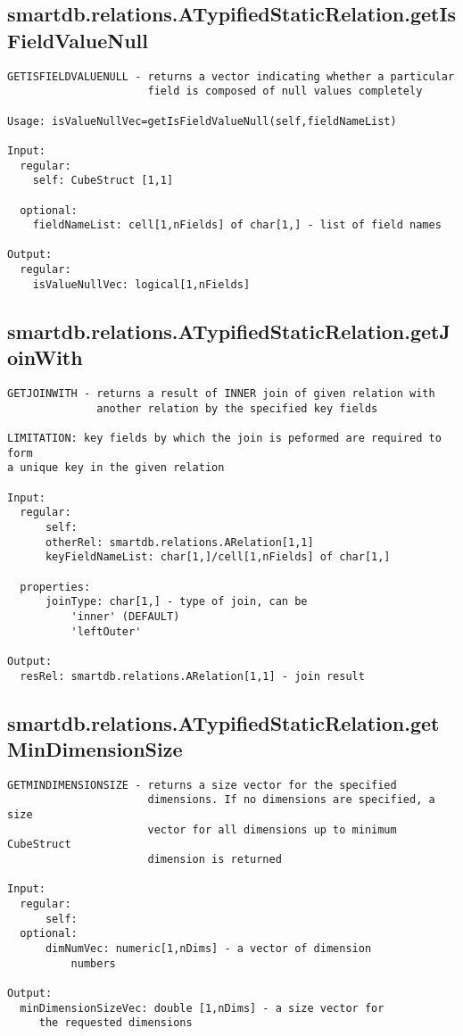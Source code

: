 \subsection{\texorpdfstring{smartdb.relations.ATypifiedStaticRelation.getIsFieldValueNull}{getIsFieldValueNull}}\label{method:smartdb.relations.ATypifiedStaticRelation.getIsFieldValueNull}
\begin{verbatim}
GETISFIELDVALUENULL - returns a vector indicating whether a particular
                      field is composed of null values completely

Usage: isValueNullVec=getIsFieldValueNull(self,fieldNameList)

Input:
  regular:
    self: CubeStruct [1,1]

  optional:
    fieldNameList: cell[1,nFields] of char[1,] - list of field names

Output:
  regular:
    isValueNullVec: logical[1,nFields]
\end{verbatim}
\subsection{\texorpdfstring{smartdb.relations.ATypifiedStaticRelation.getJoinWith}{getJoinWith}}\label{method:smartdb.relations.ATypifiedStaticRelation.getJoinWith}
\begin{verbatim}
GETJOINWITH - returns a result of INNER join of given relation with
              another relation by the specified key fields

LIMITATION: key fields by which the join is peformed are required to form
a unique key in the given relation

Input:
  regular:
      self:
      otherRel: smartdb.relations.ARelation[1,1]
      keyFieldNameList: char[1,]/cell[1,nFields] of char[1,]

  properties:
      joinType: char[1,] - type of join, can be
          'inner' (DEFAULT)
          'leftOuter'

Output:
  resRel: smartdb.relations.ARelation[1,1] - join result
\end{verbatim}
\subsection{\texorpdfstring{smartdb.relations.ATypifiedStaticRelation.getMinDimensionSize}{getMinDimensionSize}}\label{method:smartdb.relations.ATypifiedStaticRelation.getMinDimensionSize}
\begin{verbatim}
GETMINDIMENSIONSIZE - returns a size vector for the specified
                      dimensions. If no dimensions are specified, a size
                      vector for all dimensions up to minimum CubeStruct
                      dimension is returned

Input:
  regular:
      self:
  optional:
      dimNumVec: numeric[1,nDims] - a vector of dimension
          numbers

Output:
  minDimensionSizeVec: double [1,nDims] - a size vector for
     the requested dimensions
\end{verbatim}
